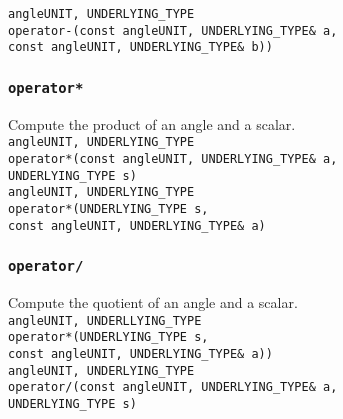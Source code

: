 \documentclass[oneside]{report}
\begin{document}
\noindent\texttt{angle\textlangle UNIT, UNDERLYING\_TYPE\textrangle}\\
\texttt{operator-}\texttt{(}\texttt{const angle\textlangle UNIT, UNDERLYING\_TYPE\textrangle\& a}\texttt{,}\\
\texttt{const angle\textlangle UNIT, UNDERLYING\_TYPE\textrangle\& b)}\texttt{)}\\

\subsubsection{\texttt{operator*}}
Compute the product of an angle and a scalar.\\

\noindent\texttt{angle\textlangle UNIT, UNDERLYING\_TYPE\textrangle}\\
\texttt{operator*}\texttt{(}\texttt{const angle\textlangle UNIT, UNDERLYING\_TYPE\textrangle\& a}\texttt{,}\\
\texttt{UNDERLYING\_TYPE s}\texttt{)}\\

\noindent{}\texttt{angle\textlangle UNIT, UNDERLYING\_TYPE\textrangle}\\
\texttt{operator*}\texttt{(}\texttt{UNDERLYING\_TYPE s}\texttt{,}\\
\texttt{const angle\textlangle UNIT, UNDERLYING\_TYPE\textrangle\& a}\texttt{)}\\

\subsubsection{\texttt{operator/}}
Compute the quotient of an angle and a scalar.\\

\noindent\texttt{angle\textlangle UNIT, UNDERLLYING\_TYPE\textrangle}\\
\texttt{operator*}\texttt{(}\texttt{UNDERLYING\_TYPE s}\texttt{,}\\
\texttt{const angle\textlangle UNIT, UNDERLYING\_TYPE\textrangle\& a)}\texttt{)}\\

\noindent\texttt{angle\textlangle UNIT, UNDERLYING\_TYPE\textrangle}\\
\texttt{operator/}\texttt{(}\texttt{const angle\textlangle UNIT, UNDERLYING\_TYPE\textrangle\& a}\texttt{,}\\
\texttt{UNDERLYING\_TYPE s)}\\
\end{document}
